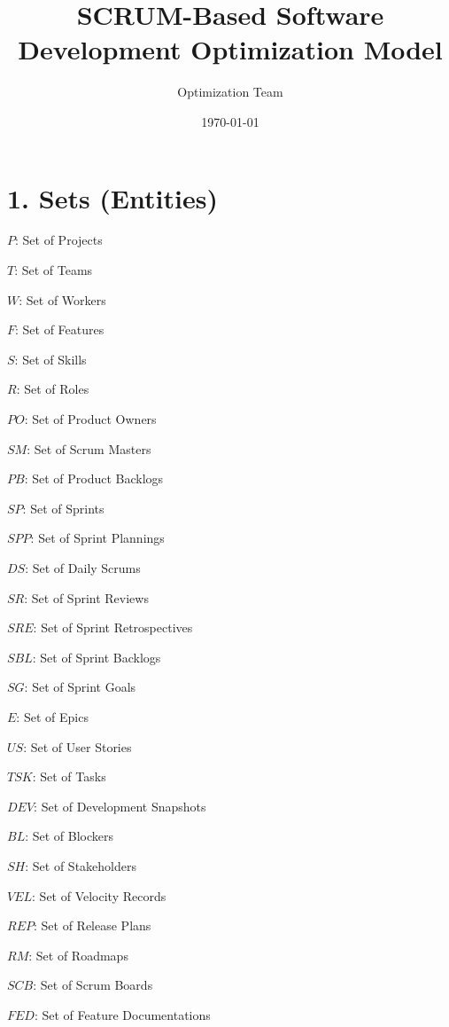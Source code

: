\documentclass[12pt]{article}
\title{SCRUM-Based Software Development Optimization Model}
\author{Optimization Team}
\date{\today}
\begin{document}
\maketitle
\tableofcontents
\newpage

\section{1. Sets (Entities)}
\item $P$: Set of Projects
    \item $T$: Set of Teams
    \item $W$: Set of Workers
    \item $F$: Set of Features
    \item $S$: Set of Skills
    \item $R$: Set of Roles
    \item $PO$: Set of Product Owners
    \item $SM$: Set of Scrum Masters
    \item $PB$: Set of Product Backlogs
    \item $SP$: Set of Sprints
    \item $SPP$: Set of Sprint Plannings
    \item $DS$: Set of Daily Scrums
    \item $SR$: Set of Sprint Reviews
    \item $SRE$: Set of Sprint Retrospectives
    \item $SBL$: Set of Sprint Backlogs
    \item $SG$: Set of Sprint Goals
    \item $E$: Set of Epics
    \item $US$: Set of User Stories
    \item $TSK$: Set of Tasks
    \item $DEV$: Set of Development Snapshots
    \item $BL$: Set of Blockers
    \item $SH$: Set of Stakeholders
    \item $VEL$: Set of Velocity Records
    \item $REP$: Set of Release Plans
    \item $RM$: Set of Roadmaps
    \item $SCB$: Set of Scrum Boards
    \item $FED$: Set of Feature Documentations
\end{document}
